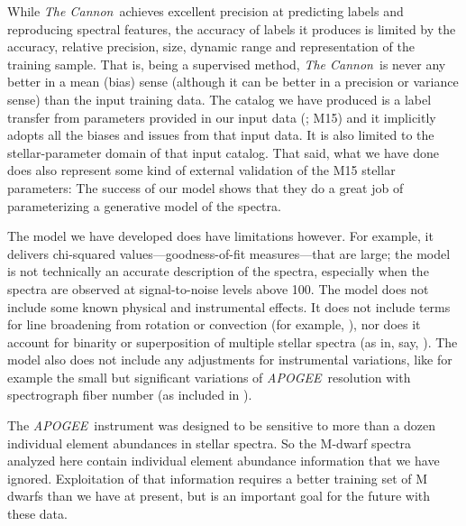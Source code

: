 \documentclass[twocolumn]{aastex62}
\newcommand{\apogee}{\textsl{APOGEE}}
\newcommand{\thecannon}{\textsl{The Cannon}}
\begin{document}
While \thecannon\ achieves excellent precision at predicting labels
and reproducing spectral features, the
accuracy of labels it produces is limited by
the accuracy, relative precision, size, dynamic range and
representation of the training sample.
That is, being a supervised method, \thecannon\ is never any better in a mean (bias) sense
(although it can be better in a precision or variance sense) than the input training
data.
The catalog we have produced is a label transfer from parameters provided
in our input data (\citealt{Mann:2015}; M15) and it implicitly adopts all the biases and
issues from that input data.
It is also limited to the stellar-parameter domain of that input catalog.
That said, what we have done does also represent some kind of external validation of the M15
stellar parameters:
The success of our model shows that they do a great job of parameterizing a generative
model of the spectra.

The model we have developed does have limitations however.
For example, it delivers chi-squared values---goodness-of-fit measures---that
are large; the model is not technically an accurate description of the spectra,
especially when the spectra are observed at signal-to-noise levels above 100.
The model does not include some known physical and instrumental effects.
It does not include terms for line broadening from rotation or
convection (for example, \citealt{Behmard2019}), nor
does it account for binarity or superposition of multiple
stellar spectra (as in, say, \citealt{ElBadry:2018}).
The model also does not include any adjustments for instrumental variations, like for
example the small but significant variations of \apogee\ resolution with
spectrograph fiber number (as included in \citealt{Ness2018}).

The \apogee\ instrument was designed to be sensitive to more than
a dozen individual element abundances in stellar spectra.
So the M-dwarf spectra analyzed here contain individual element abundance
information that we have ignored.
Exploitation of that information requires a better training set of M dwarfs than
we have at present, but is an important goal for the future with these data.
\end{document}
